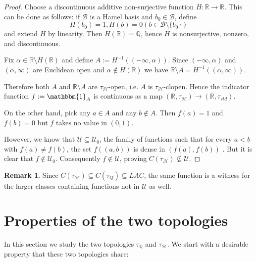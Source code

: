 \documentclass[11pt]{amsart} %
\theoremstyle{definition}
\newtheorem{remark}[theorem]{Remark}
\newcommand{\B}{\mathcal{B}}
\newcommand{\R}{\mathbb{R}}
\newcommand{\U}{\mathcal{U}}
\newcommand{\Q}{\mathbb{Q}}
\newcommand{\AD}{\mathcal{H}}
\begin{document}
\begin{proof}
Choose a discontinuous additive non-surjective function $H:\mathbb{R}\rightarrow\mathbb{R}$. This can be done as follows: if $\B$ is a Hamel basis and $b_0\in \B$, define 
\begin{equation} 
H(b_0)=1, H(b)=0 (b\in \B\setminus \{b_0\})
\end{equation} 
and extend $H$ by linearity. Then $H(\R)=\Q$, hence $H$ is nonsurjective, nonzero, and discontinuous. 

Fix $\alpha\in\mathbb{R}\setminus H(\mathbb{R})$ and define $A:=H^{-1}((-\infty,\alpha))$. Since $(-\infty, \alpha)$ and $(\alpha, \infty)$ are Euclidean open and $\alpha \notin H(\mathbb{R})$ we have $\mathbb{R}\setminus A=H^{-1}((\alpha,\infty))$.

Therefore both $A$ and $\mathbb{R}\setminus A$ are $\tau_{\AD}$-open, i.e. $A$ is $\tau_{\AD}$-clopen. Hence the indicator function $f:=\mathbbm{1}_{A}$ is continuous as a map $(\mathbb{R},\tau_{\AD})\rightarrow(\mathbb{R},\tau_{std})$.

On the other hand, pick any $a\in A$ and any $b\notin A$. Then $f(a)=1$ and $f(b)=0$ but $f$ takes no value in $(0,1)$.

However, we know that $\mathcal{U}\subseteq\mathcal{U}_{0}$, the family of functions such that for every $a<b$ with $f(a)\ne f(b)$, the set $f((a,b))$ is dense in $(f(a),f(b))$ \cite{6}. But it is clear that $f\notin\mathcal{U}_{0}$. Consequently $f\notin\mathcal{U}$, proving $C(\tau_{\AD})\not\subseteq\U$.
\end{proof}

\begin{remark} 
Since $C(\tau_{\AD})\subseteq C(\tau_{Q})\subseteq LAC$, the same function is a witness for the larger classes containing functions not in $\U$ as well. 
\end{remark} 


\section{Properties of the two topologies}

In this section we study the two topologies $\tau_{\Q}$ and $\tau_{\AD}$. We start with a desirable property that these two topologies share: 
\end{document}
